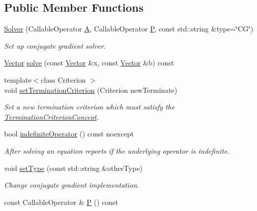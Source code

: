 \subsection*{Public Member Functions}
\begin{DoxyCompactItemize}
\item 
\hyperlink{classSpacy_1_1CG_1_1Solver_a4b6e80b42da6ee9a64cbd07f85964cd5}{Solver} (Callable\+Operator \hyperlink{classSpacy_1_1CG_1_1Solver_a9b0fa76350c42fb60b2fbeb40b343fa2}{A}, Callable\+Operator \hyperlink{classSpacy_1_1CG_1_1Solver_a929d2b9deecfd96ef7efb8097e567f37}{P}, const std\+::string \&type=\char`\"{}C\+G\char`\"{})
\begin{DoxyCompactList}\small\item\em Set up conjugate gradient solver. \end{DoxyCompactList}\item 
\hyperlink{classSpacy_1_1Vector}{Vector} \hyperlink{classSpacy_1_1CG_1_1Solver_a23770606bb41f2d8f5a6ae71d07934ab}{solve} (const \hyperlink{classSpacy_1_1Vector}{Vector} \&x, const \hyperlink{classSpacy_1_1Vector}{Vector} \&b) const 
\item 
{\footnotesize template$<$class Criterion $>$ }\\void \hyperlink{classSpacy_1_1CG_1_1Solver_a7fe2345e859b267c86acff9f3920db3b}{set\+Termination\+Criterion} (Criterion new\+Terminate)
\begin{DoxyCompactList}\small\item\em Set a new termination criterion which must satisfy the \hyperlink{group__ConceptGroup_CG_TerminationCriterionConceptAnchor}{Termination\+Criterion\+Concept}. \end{DoxyCompactList}\item 
bool \hyperlink{classSpacy_1_1CG_1_1Solver_ae0b6c7b754e093610df6d67bf3067acf}{indefinite\+Operator} () const noexcept
\begin{DoxyCompactList}\small\item\em After solving an equation reports if the underlying operator is indefinite. \end{DoxyCompactList}\item 
void \hyperlink{classSpacy_1_1CG_1_1Solver_a4009b5e2062e4930f0cfdc9d979c7b80}{set\+Type} (const std\+::string \&other\+Type)
\begin{DoxyCompactList}\small\item\em Change conjugate gradient implementation. \end{DoxyCompactList}\item 
const Callable\+Operator \& \hyperlink{classSpacy_1_1CG_1_1Solver_a929d2b9deecfd96ef7efb8097e567f37}{P} () const 

\end{DoxyCompactItemize}
